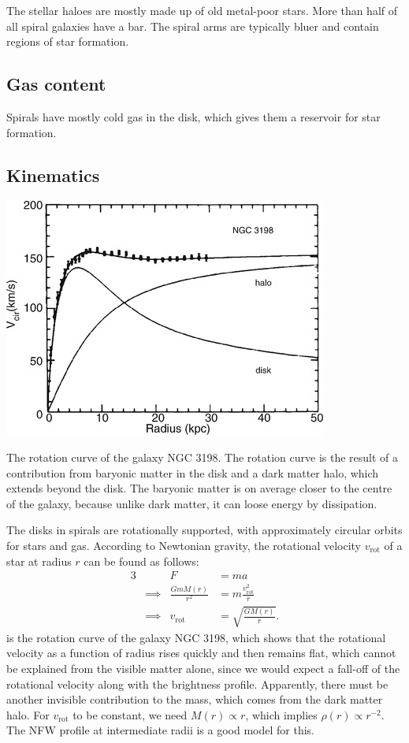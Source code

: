 The stellar haloes are mostly made up of old metal-poor stars.
More than half of all spiral galaxies have a bar.
The spiral arms are typically bluer and contain regions of star formation.

\subsection{Gas content}
Spirals have mostly cold gas in the disk, which gives them a reservoir for star formation.

\subsection{Kinematics}
\begin{marginfigure}
	\includegraphics[width=\textwidth]{img/ch-05/rotation-curve.png}
	\caption{The rotation curve of the galaxy NGC 3198. The rotation curve is the result of a contribution from baryonic matter in the disk and a dark matter halo, which extends beyond the disk. The baryonic matter is on average closer to the centre of the galaxy, because unlike dark matter, it can loose energy by dissipation.}
	\label{fig:rotation-curve}
\end{marginfigure}
The disks in spirals are rotationally supported, with approximately circular orbits for stars and gas.
According to Newtonian gravity, the rotational velocity $v_\text{rot}$ of a star at radius $r$ can be found as follows:
\begin{alignat*}{3}
	         && F &= ma\\
	&\implies & \frac{G m M(r)}{r^2} &= m \frac{v_\text{rot}^2}{r}\\
	&\implies & v_\text{rot} &= \sqrt{\frac{G M(r)}{r}}.
\end{alignat*}
 is the rotation curve of the galaxy NGC 3198, which shows that the rotational velocity as a function of radius rises quickly and then remains flat, which cannot be explained from the visible matter alone, since we would expect a fall-off of the rotational velocity along with the brightness profile.
Apparently, there must be another invisible contribution to the mass, which comes from the dark matter halo.
For $v_\text{rot}$ to be constant, we need $M(r) \propto r$, which implies $\rho(r) \propto r^{-2}$.
The NFW profile at intermediate radii is a good model for this.

